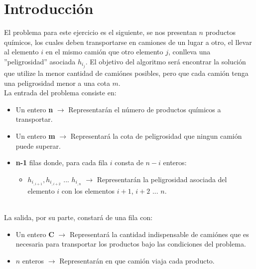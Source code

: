 \section{Introducci\'on}
El problema para este ejercicio es el siguiente, se nos presentan $n$ productos qu\'imicos, los cuales deben transportarse en camiones de un lugar a otro, el llevar al elemento $i$ en el mismo cami\'on que otro elemento $j$, conlleva una ''peligrosidad'' asociada $h_i_j$. El objetivo del algoritmo ser\'a encontrar la soluci\'on que utilize la menor cantidad de cami\'ones posibles, pero que cada cami\'on tenga una peligrosidad menor a una cota $m$.
\\
La entrada del problema consiste en:
\\
\begin{itemize}
\item Un entero \textbf{n} $\rightarrow$ Representar\'an el n\'umero de productos qu\'imicos a transportar.
\item Un entero \textbf{m} $\rightarrow$ Representar\'a la cota de peligrosidad que ningun cami\'on puede superar.
\item \textbf{n-1} filas donde, para cada fila $i$ consta de $n-i$ enteros:
\begin{itemize}
\item $h_i_{,i+1}, h_i_{,i+2}$ ... $h_i_{,n}$ $\rightarrow$ Representar\'an la peligrosidad asociada del elemento $i$ con los elementos $i+1$, $i+2$ ... $n$.
\end{itemize}
\end{itemize}
\\
La salida, por su parte, constar\'a de una fila con:
\\
\begin{itemize}
\item Un entero \textbf{C} $\rightarrow$ Representar\'a la cantidad indispensable de cami\'ones que es necesaria para transportar los productos bajo las condiciones del problema.
\item $n$ enteros $\rightarrow$ Representar\'an en que cami\'on viaja cada producto.
\end{itemize}

